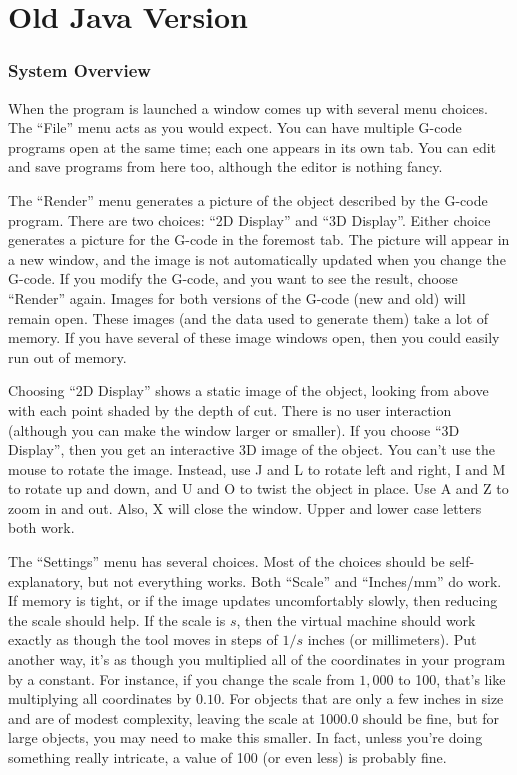 \documentclass[titlepage,oneside,10pt]{article}
\begin{document}
\vskip 2cm


\pagebreak


\part{Old Java Version}

\section{System Overview}

When the program is launched a window comes up with several menu
choices. The ``File'' menu acts as you would expect. You can have
multiple G-code programs open at the same time; each one appears in
its own tab. You can edit and save programs from here too, although
the editor is nothing fancy.

The ``Render'' menu generates a picture of the object described by
the G-code program. There are two choices: ``2D Display'' and ``3D
Display''. Either choice generates a picture for the G-code in 
the foremost tab. The picture will appear in a new window, and 
the image is not automatically updated when you change the
G-code. If you modify the G-code, and you want to see the result,
choose ``Render'' again. Images for both versions of the G-code (new
and old) will remain open. These images (and the data used to generate
them) take a lot of memory. If you have several of these image windows
open, then you could easily run out of memory.

Choosing ``2D Display'' shows a static image of the object, looking
from above with each point shaded by the depth of cut. There is no
user interaction (although you can make the window larger or
smaller). If you choose ``3D Display'', then you get an interactive
3D image of the object. You can't use the mouse to rotate the
image. Instead, use J and L to rotate left and right, I and M to
rotate up and down, and U and O to twist the object in place. Use A
and Z to zoom in and out. Also, X will close the window. Upper and
lower case letters both work.

The ``Settings'' menu has several choices. Most of the choices should
be self-explanatory, but not everything works. Both ``Scale'' and
``Inches/mm'' do work. If memory is tight, or if the
image updates uncomfortably slowly, then reducing the scale
should help. If the scale is $s$, then the virtual machine should work
exactly as though the tool moves in steps of $1/s$ inches (or
millimeters). Put another way, it's as though you multiplied all of
the coordinates in your program by a constant. For instance, if you
change the scale from $1,000$ to 100, that's like multiplying all
coordinates by $0.10$. For objects that are only a few inches in size and are
of modest complexity, leaving the scale at 1000.0 should be fine, but
for large objects, you may need to make this smaller. In fact, unless you're
doing something really intricate, a value of 100 (or even less) is
probably fine. 
\end{document}
